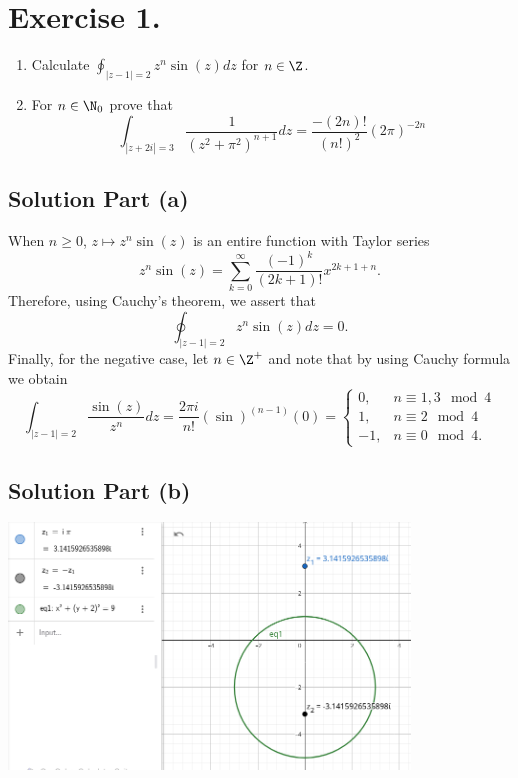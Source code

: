 \section*{Exercise 1.}

\begin{enumerate}[label=(\alph*)]
    \item Calculate $\displaystyle \oint_{|z-1| = 2} z^{n}\sin(z) dz$ for $n\in\Z$.
    \item For $n \in \N_0$ prove that
    \[ \int_{|z+2i| = 3} \frac{1}{(z^2+\pi^2)^{n+1}}dz = \frac{-(2n)!}{(n!)^2}(2\pi)^{-2n} \]
\end{enumerate}

\subsection*{Solution Part (a)}
When $n\geq 0$, $z \mapsto z^n \sin(z)$ is an entire function with Taylor series
\[ z^n \sin(z) = \sum_{k = 0}^\infty \frac{(-1)^k}{(2k+1)!}x^{2k+1+n}.  \]
Therefore, using Cauchy's theorem, we assert that
\[ \oint_{|z-1| = 2} z^{n}\sin(z) dz = 0.  \]
Finally, for the negative case, let $n \in \Z^+$ and note that by using Cauchy formula we obtain
\[ \int_{|z-1| = 2} \frac{\sin(z)}{z^{n}} dz = \frac{2\pi i}{n!} (\sin)^{(n-1)}(0) = \begin{cases}
    0, & n \equiv 1,3 \mod 4\\
    1, & n \equiv 2 \mod 4\\
    -1,& n \equiv 0 \mod 4.
\end{cases} \]

\subsection*{Solution Part (b)}

\begin{center}
    \includegraphics*[width=0.8\textwidth]{../pictures/hw3ex1pic1.png}
\end{center}

